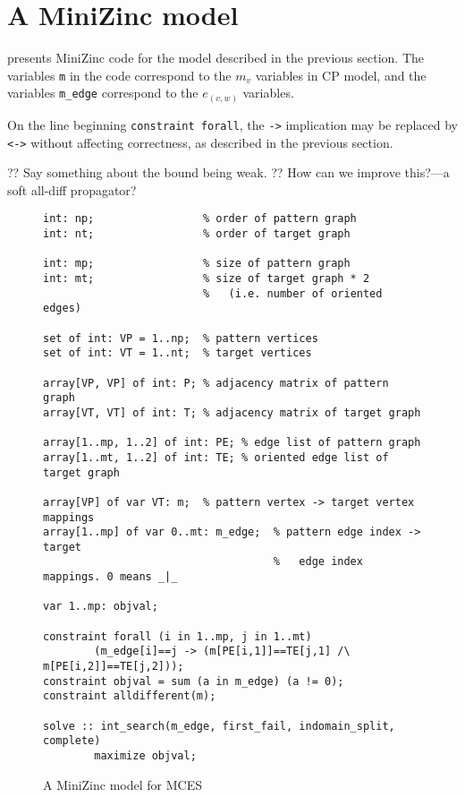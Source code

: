\section{A MiniZinc model}

 presents MiniZinc code for the model described in the
previous section.  The variables \texttt{m} in the code correspond to the
$m_v$ variables in CP model, and the variables \texttt{m\_edge} correspond
to the $e_{(v,w)}$ variables.

On the line beginning \texttt{constraint forall}, the \texttt{->} implication
may be replaced by \texttt{<->} without affecting correctness, as described
in the previous section.

?? Say something about the bound being weak.  ?? How can we improve
this?---a soft all-diff propagator?

\begin{figure}[htb]
\vspace{.8em}
\scriptsize
\begin{verbatim}
int: np;                 % order of pattern graph
int: nt;                 % order of target graph

int: mp;                 % size of pattern graph
int: mt;                 % size of target graph * 2
                         %   (i.e. number of oriented edges)

set of int: VP = 1..np;  % pattern vertices
set of int: VT = 1..nt;  % target vertices

array[VP, VP] of int: P; % adjacency matrix of pattern graph
array[VT, VT] of int: T; % adjacency matrix of target graph

array[1..mp, 1..2] of int: PE; % edge list of pattern graph
array[1..mt, 1..2] of int: TE; % oriented edge list of target graph

array[VP] of var VT: m;  % pattern vertex -> target vertex mappings
array[1..mp] of var 0..mt: m_edge;  % pattern edge index -> target
                                    %   edge index mappings. 0 means _|_

var 1..mp: objval;

constraint forall (i in 1..mp, j in 1..mt)
        (m_edge[i]==j -> (m[PE[i,1]]==TE[j,1] /\ m[PE[i,2]]==TE[j,2]));
constraint objval = sum (a in m_edge) (a != 0);
constraint alldifferent(m);

solve :: int_search(m_edge, first_fail, indomain_split, complete)
        maximize objval;
\end{verbatim}
\vspace{-1em}
\caption{A MiniZinc model for MCES}\label{fig:model3}
\end{figure}


